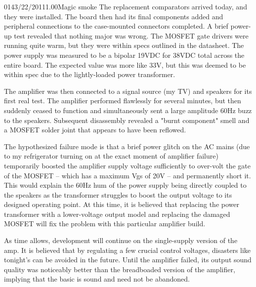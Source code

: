 \documentclass[12pt,letterpaper,onecolumn]{article}
\begin{document}
\begin{nbentry}{014}{3/22/2011}{1.00}{Magic smoke}
The replacement comparators arrived today, and they were installed.  The board then had its final components added and peripheral connections to the case-mounted connectors completed.  A brief power-up test revealed that nothing major was wrong.  The MOSFET gate drivers were running quite warm, but they were within specs outlined in the datasheet.  The power supply was measured to be a bipolar 19VDC for 38VDC total across the entire board.  The expected value was more like 33V, but this was deemed to be within spec due to the lightly-loaded power transformer.

The amplifier was then connected to a signal source (my TV) and speakers for its first real test.  The amplifier performed flawlessly for several minutes, but then suddenly ceased to function and simultaneously sent a large amplitude 60Hz buzz to the speakers.  Subsequent disassembly revealed a "burnt component" smell and a MOSFET solder joint that appears to have been reflowed.

The hypothesized failure mode is that a brief power glitch on the AC mains (due to my refrigerator turning on at the exact moment of amplifier failure) temporarily boosted the amplifier supply voltage sufficiently to over-volt the gate of the MOSFET -- which has a maximum Vgs of 20V -- and permanently short it.  This would explain the 60Hz hum of the power supply being directly coupled to the speakers as the transformer struggles to boost the output voltage to its designed operating point.  At this time, it is believed that replacing the power transformer with a lower-voltage output model and replacing the damaged MOSFET will fix the problem with this particular amplifier build.

As time allows, development will continue on the single-supply version of the amp.  It is believed that by regulating a few crucial control voltages, disasters like tonight's can be avoided in the future.  Until the amplifier failed, its output sound quality was noticeably better than the breadboaded version of the amplifier, implying that the basic is sound and need not be abandoned.
\end{nbentry}
\end{document}
